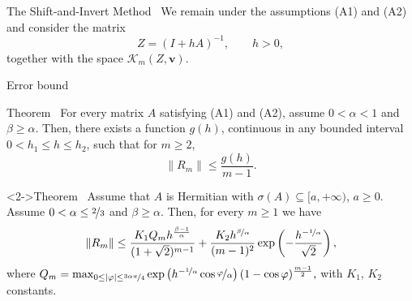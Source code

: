 \documentclass[aspectratio=169,xcolor=dvipsnames]{beamer}
\begin{document}
\begin{frame}{The Shift-and-Invert Method~{\Large \parencite{MoretNovatiML}}}
We remain under the assumptions (A1) and (A2) and consider the matrix
\[
Z = (I + h A)^{-1}, \qquad h > 0,
\]
together with the space $\mathcal{K}_{m}(Z,\mathbf{v})$.



\end{frame}

\begin{frame}{Error bound~\parencite{MoretNovatiML}}

\begin{alertblock}{Theorem~\parencite[Theorem~4.3]{MoretNovatiML}}
For every matrix $A$ satisfying (A1) and (A2), assume $0 < \alpha < 1$ and $\beta \geq \alpha$. Then, there exists a function $g(h)$, continuous in any bounded interval $0 < h_1 \leq h \leq h_2$, such that for $m \geq 2$,\vspace{-0.5em}
\[
\|R_m\| \leq \frac{g(h)}{m-1}.
\]
\end{alertblock}

\begin{alertblock}<2->{Theorem~\parencite[Theorem~4.5]{MoretNovatiML}}
Assume that $A$ is Hermitian with $\sigma(A) \subseteq [a,+\infty)$, $a \geq 0$. Assume $0 < \alpha \leq \nicefrac{2}{3}$ and $\beta \geq \alpha$. Then, for every $m \geq 1$ we have\vspace{-0.5em}
\[
\|R_m\| \leq \frac{K_1 Q_m h^{\frac{\beta-1}{\alpha}}}{(1+\sqrt{2})^{m-1}} + \frac{K_2 h^{\nicefrac{\beta}{\alpha}}}{(m-1)^2} \exp\left( - \frac{ h^{-\nicefrac{1}{\alpha}}}{\sqrt{2}} \right),
\]
where 
$
Q_m = \max_{0 \leq |\varphi| \leq \nicefrac{3\alpha\pi}{4}} \exp\left( h^{-\nicefrac{1}{\alpha}} \cos \nicefrac{\varphi}{\alpha} \right) (1-\cos\varphi)^{\frac{m-1}{2}},
$
with $K_1$, $K_2$ constants.
\end{alertblock}

\end{frame}
\end{document}
